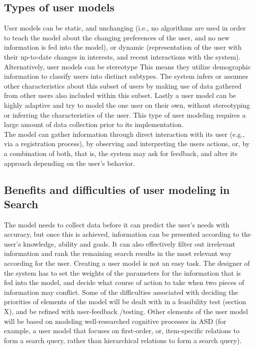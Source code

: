 \documentclass[11pt]{article}
\begin{document}
\subsection{Types of user models}
User models can be static, and unchanging (i.e., no algorithms are used in order to teach the model about the changing preferences of the user, and no new information is fed into the model), or dynamic (representation of the user with their up-to-date changes in interests, and recent interactions with the system). Alternatively, user models can be stereotype
This means they utilize demographic information to classify users into distinct subtypes. The system infers or assumes other characteristics about this subset of users by making use of data gathered from other users also included within this subset. Lastly a user model can be highly adaptive and try to model the one user on their own, without stereotyping or inferring the characteristics of the user. This type of user modeling requires a large amount of data collection prior to its implementation.
\\The model can gather information through direct interaction with its user (e.g., via a registration process), by observing and interpreting the users actions, or, by a combination of both, that is, the system may ask for feedback, and alter its approach depending on the user’s behavior.

\subsection{Benefits and difficulties of user modeling in Search}
The model needs to collect data before it can predict the user’s needs with accuracy, but once this is achieved, information can be presented according to the user’s knowledge, ability and goals. It can also effectively filter out irrelevant information and rank the remaining search results in the most relevant way according for the user.
Creating a user model is not an easy task. The designer of the system has to set the weights of the parameters for the information that is fed into the model, and decide what course of action to take when two pieces of information may conflict. Some of the difficulties associated with deciding the priorities of elements of the model will be dealt with in a feasibility test (section X), and be refined with user-feedback /testing. Other elements of the user model will be based on modeling well-researched cognitive processes in ASD (for example, a user model that focuses on first-order, or, item-specific relations to form a search query, rather than hierarchical relations to form a search query).  
\end{document}
